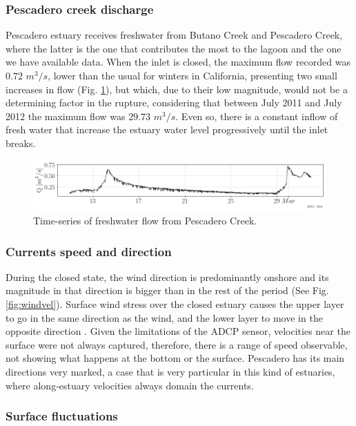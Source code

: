 \documentclass[tesis.tex]{subfiles}
\begin{document}
\subsubsection{Pescadero creek discharge}

Pescadero estuary receives freshwater from Butano Creek and Pescadero Creek, where the latter is the one that contributes the most to the lagoon and the one we have available data. When the inlet is closed, the maximum flow recorded was $0.72$ $m^3/s$, lower than the usual for winters in California, presenting two small increases in flow (Fig. \ref{fig:q}), but which, due to their low magnitude, would not be a determining factor in the rupture, considering that between July 2011 and July 2012 the maximum flow was $29.73$ $m^3/s$. Even so, there is a constant inflow of fresh water that increase the estuary water level progressively until the inlet breaks.  

\begin{figure}[h!]
    \centering
    \includegraphics[width=\textwidth]{Imagenes/Q.png}
    \caption{Time-series of freshwater flow from Pescadero Creek.}
    \label{fig:q}
\end{figure}

\subsubsection{Currents speed and direction}

During the closed state, the wind direction is predominantly onshore and its magnitude in that direction is bigger than in the rest of the period (See Fig. \ref{fig:windvel}). Surface wind stress over the closed estuary causes the upper layer to go in the same direction as the wind, and the lower layer to move in the opposite direction \citep{Katopodes2018}. Given the limitations of the ADCP sensor, velocities near the surface were not always captured, therefore, there is a range of speed observable, not showing what happens at the bottom or the surface. Pescadero has its main directions very marked, a case that is very particular in this kind of estuaries, where along-estuary velocities always domain the currents. \\

\subsubsection{Surface fluctuations}
\end{document}
